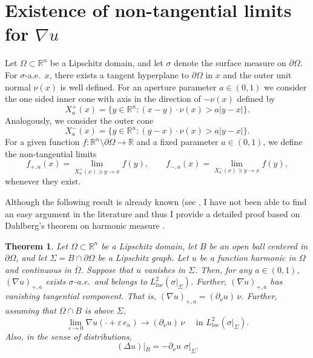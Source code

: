 \documentclass[11pt]{amsart}
\newcommand{\R}{{\mathbb R}}       %
\newcommand{\ve}{{\varepsilon}}
\newtheorem{theorem}{Theorem}[section]
\theoremstyle{definition}
\theoremstyle{remark}
\numberwithin{equation}{section}
\begin{document}

\appendix

\section{Existence of non-tangential limits for $\nabla u$}

Let $\Omega\subset\R^n$ be a Lipschitz domain, and let $\sigma$ denote the surface measure on
$\partial\Omega$. For $\sigma$-a.e.\ $x$, there exists a tangent hyperplane to $\partial\Omega$ in $x$ and 
the outer unit normal $\nu(x)$ is well defined.
For an aperture parameter $a\in(0,1)$ we consider the one sided inner cone with axis in the direction of $-\nu(x)$ defined by
$$X_a^+(x)=\bigl\{y\in\R^{n}:(x-y)\cdot \nu(x)> a|y-x|\bigr\}.$$
Analogously, we consider the outer cone
$$X_a^-(x)=\bigl\{y\in\R^{n}:(y-x)\cdot \nu(x)> a|y-x|\bigr\}.$$
For a given function $f:\R^n\setminus\partial\Omega\to\R$ and a fixed parameter $a\in(0,1)$, we define the non-tangential limits
\begin{equation*}%
f_{+,a}(x) = \lim_{X_a^+(x)\ni y\to x} f(y),\qquad f_{-,a}(x) = \lim_{X_a^-(x)\ni y\to x} f(y),
\end{equation*}
whenever they exist. 

Although the following result is already known (see \cite[Theorem 5.19]{Kenig-Pipher}, I have not
been able to find an easy argument in the literature and thus I provide a detailed proof based on Dahlberg’s theorem on harmonic measure \cite{Dah}.


\begin{theorem}\label{teoap1}
Let $\Omega\subset\R^n$ be a Lipschitz domain, let $B$ be an open ball centered in $\partial\Omega$,
and let $\Sigma = B\cap \partial\Omega$ be a Lipschitz graph.
Let $u$ be a function harmonic in $\Omega$ and continuous in $\overline\Omega$. Suppose that $u$  vanishes in $\Sigma$. Then, for any $a\in(0,1)$, $(\nabla u)_{+,a}$ exists $\sigma$-a.e.\
and belongs to $L^2_{loc}(\sigma|_\Sigma)$. Further, $(\nabla u)_{+,a}$
 has vanishing tangential component. That is,  $(\nabla u)_{+,a}
 = (\partial_\nu u)\,\nu$. 
 Further, assuming that $\Omega\cap B$ is above $\Sigma$, 
$$
\lim_{\ve\to0} \nabla u(\cdot+\ve\, e_n) \to (\partial_\nu u)\,\nu \quad \mbox{ in $L^2_{loc}(\sigma|_\Sigma).$}
$$ 
 Also, in the sense of distributions,
$$(\Delta u)|_B = -\partial_\nu u\,\,\sigma|_\Sigma.$$
\end{theorem}
\end{document}
